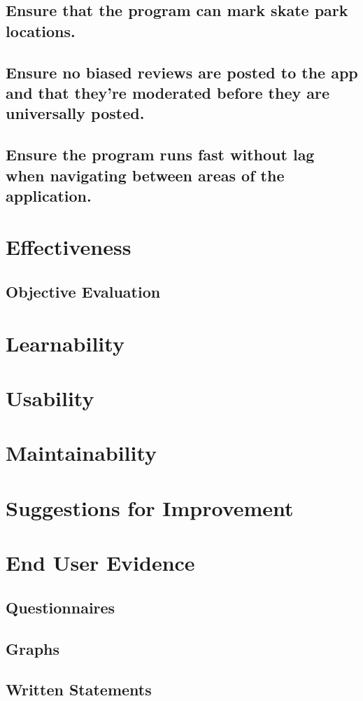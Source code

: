 \subsection {Ensure that the program can mark skate park locations.}


\subsection {Ensure no biased reviews are posted to the app and that they're moderated before they are universally posted.}

\subsection {Ensure the program runs fast without lag when navigating between areas of the application.}



\section{Effectiveness}

\subsection{Objective Evaluation}

\section{Learnability}

\section{Usability}

\section{Maintainability}

\section{Suggestions for Improvement}

\section{End User Evidence}

\subsection{Questionnaires}

\subsection{Graphs}

\subsection{Written Statements}

